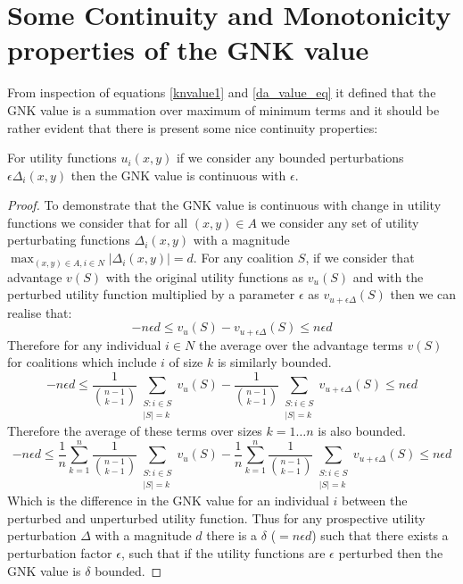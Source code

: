 \appendix


\section{Some Continuity and Monotonicity properties of the GNK value}\label{appendix:continuity_of_GNK}

From inspection of equations \ref{knvalue1} and \ref{da_value_eq} it defined that the GNK value is a summation over maximum of minimum terms and it should be rather evident that there is present some nice continuity properties:

\begin{theorem}
For utility functions $u_i(x,y)$ if we consider any bounded perturbations $\epsilon \Delta_i(x,y)$ then the GNK value is continuous with $\epsilon$.
\end{theorem}
\begin{proof}
To demonstrate that the GNK value is continuous with change in utility functions we consider that for all $(x,y)\in A$ we consider any set of utility perturbating functions $\Delta_i(x,y)$ with a magnitude $\max_{(x,y)\in A, i\in N}|\Delta_i(x,y)| = d$.
For any coalition $S$, if we consider that advantage $v(S)$ with the original utility functions as $v_u(S)$ and with the perturbed utility function multiplied by a parameter $\epsilon$ as $v_{u+\epsilon \Delta}(S)$ then we can realise that:
$$-n\epsilon d \le v_u(S)-v_{u+\epsilon \Delta}(S) \le n\epsilon d$$
Therefore for any individual $i\in N$ the average over the advantage terms $v(S)$ for coalitions which include $i$ of size $k$ is similarly bounded.
$$-n\epsilon d \le \frac{1}{\binom{n-1}{k-1}} \sum_{\substack{S:i\in S \\ |S|=k}}v_u(S)-\frac{1}{\binom{n-1}{k-1}} \sum_{\substack{S:i\in S \\ |S|=k}}v_{u+\epsilon \Delta}(S) \le n\epsilon d$$
Therefore the average of these terms over sizes $k=1\dots n$ is also bounded.
$$-n\epsilon d \le \frac{1}{n}\sum_{k=1}^n \frac{1}{\binom{n-1}{k-1}} \sum_{\substack{S:i\in S \\ |S|=k}}v_u(S)-\frac{1}{n}\sum_{k=1}^n \frac{1}{\binom{n-1}{k-1}} \sum_{\substack{S:i\in S \\ |S|=k}}v_{u+\epsilon \Delta}(S) \le n\epsilon d$$
Which is the difference in the GNK value for an individual $i$ between the perturbed and unperturbed utility function.
Thus for any prospective utility perturbation $\Delta$ with a magnitude $d$ there is a $\delta$ ($=n\epsilon d$) such that there exists a perturbation factor $\epsilon$, such that if the utility functions are $\epsilon$ perturbed then the GNK value is $\delta$ bounded.
\end{proof}

